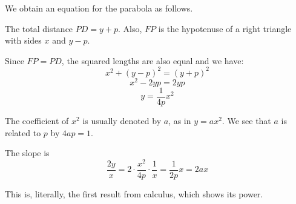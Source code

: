 \documentclass[11pt, oneside]{article}
\begin{document}
We obtain an equation for the parabola as follows.

The total distance $PD = y + p$.  Also, $FP$ is the hypotenuse of a right triangle with sides $x$ and $y - p$.

Since $FP = PD$, the squared lengths are also equal and we have:
\[ x^2 + (y - p)^2 = (y + p)^2 \]
\[ x^2 - 2yp = 2yp \]
\[ y = \frac{1}{4p} x^2 \]

The coefficient of $x^2$ is usually denoted by $a$, as in $y = ax^2$.  We see that $a$ is related to $p$ by $4ap = 1$.

The slope is 
\[ \frac{2y}{x} =  2 \cdot \frac{x^2}{4p} \cdot \frac{1}{x} = \frac{1}{2p} x = 2ax \]

This is, literally, the first result from calculus, which shows its power.
\end{document}
